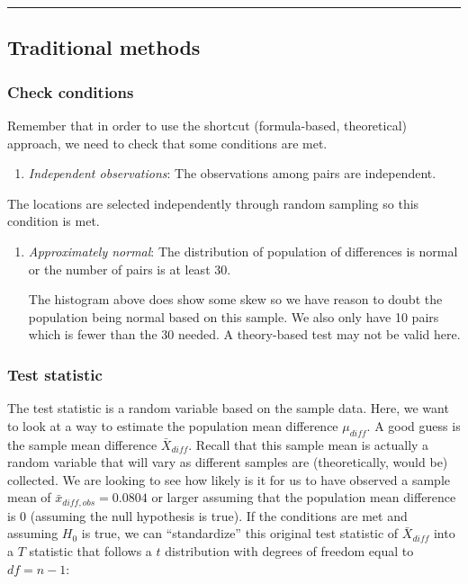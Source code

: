 \documentclass[]{tufte-book}
\let\oldrule=\rule
\renewcommand{\rule}[1]{\oldrule{\linewidth}}
\providecommand{\tightlist}{%
  \setlength{\itemsep}{0pt}\setlength{\parskip}{0pt}}
\theoremstyle{definition}
\theoremstyle{definition}
\theoremstyle{remark}
\begin{document}
\begin{center}\rule{0.5\linewidth}{\linethickness}\end{center}

\subsection{Traditional methods}\label{traditional-methods-4}

\subsubsection{Check conditions}\label{check-conditions-4}

Remember that in order to use the shortcut (formula-based, theoretical)
approach, we need to check that some conditions are met.

\begin{enumerate}
\def\labelenumi{\arabic{enumi}.}
\tightlist
\item
  \emph{Independent observations}: The observations among pairs are
  independent.
\end{enumerate}

The locations are selected independently through random sampling so this
condition is met.

\begin{enumerate}
\def\labelenumi{\arabic{enumi}.}
\setcounter{enumi}{1}
\item
  \emph{Approximately normal}: The distribution of population of
  differences is normal or the number of pairs is at least 30.

  The histogram above does show some skew so we have reason to doubt the
  population being normal based on this sample. We also only have 10
  pairs which is fewer than the 30 needed. A theory-based test may not
  be valid here.
\end{enumerate}

\subsubsection{Test statistic}\label{test-statistic-4}

The test statistic is a random variable based on the sample data. Here,
we want to look at a way to estimate the population mean difference
\(\mu_{diff}\). A good guess is the sample mean difference
\(\bar{X}_{diff}\). Recall that this sample mean is actually a random
variable that will vary as different samples are (theoretically, would
be) collected. We are looking to see how likely is it for us to have
observed a sample mean of \(\bar{x}_{diff, obs} = 0.0804\) or larger
assuming that the population mean difference is 0 (assuming the null
hypothesis is true). If the conditions are met and assuming \(H_0\) is
true, we can ``standardize'' this original test statistic of
\(\bar{X}_{diff}\) into a \(T\) statistic that follows a \(t\)
distribution with degrees of freedom equal to \(df = n - 1\):
\end{document}
